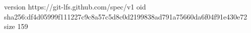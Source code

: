 version https://git-lfs.github.com/spec/v1
oid sha256:df4d05999f111227c9c8a57c5d8c0d2199838ad791a75660da6f04f91e430e72
size 159
